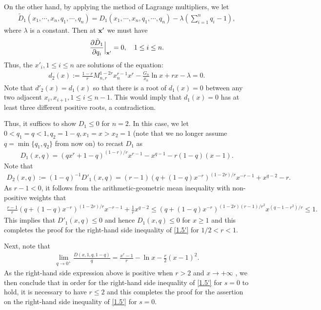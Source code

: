 \documentclass[11pt]{amsart}
\numberwithin{equation}{section}
\theoremstyle{definition}
\theoremstyle{remark}
\begin{document}
   On the other hand, by applying the method of Lagrange multipliers, we let
\begin{align*}
   \tilde{D}_1(x_1, \cdots, x_n, q_1, \cdots, q_n)=D_1(x_1, \cdots, x_n, q_1, \cdots, q_n)-\lambda(\sum^n_{i=1}q_i-1),
\end{align*}
   where $\lambda$ is a constant. Then at ${\bf x}'$ we must have
\begin{align*}
   \frac {\partial \tilde{D}_1}{\partial q_i}\Big |_{{\bf x}'}=0, \quad 1 \leq i \leq n.
\end{align*}
   Thus, the $x'_i, 1 \leq i \leq n$ are solutions of the equation:
\begin{align*}
   d_2(x) := \frac {1-r}{r}M^{1-2r}_{n,r}x^{r-1}_nx^{r}-\frac {G_n}{x_n}\ln x+rx-\lambda=0.
\end{align*}
   Note that $d'_2(x)=d_1(x)$ so that there is a root of $d_1(x)=0$ between any two adjacent $x_i, x_{i+1}, 1 \leq i \leq n-1$. This would imply that
   $d_1(x)=0$ has at least three different positive roots, a contradiction.

   Thus, it suffices to show $D_1 \leq 0$ for $n=2$. In this case, we let $0< q_1=q <1, q_2=1-q, x_1=x>x_2=1$ (note that we no longer assume $q=\min \{ q_1, q_2 \}$ from now on) to recast $D_1$ as
\begin{align*}
   D_1(x, q)=(qx^r+1-q)^{(1-r)/r}x^{r-1}-x^{q-1}-r(1-q)(x-1).
\end{align*}
    Note that
\begin{align*}
   D_2(x,q) :=(1-q)^{-1}D'_1(x, q)=(r-1)(q+(1-q)x^{-r})^{(1-2r)/r}x^{-r-1}+x^{q-2}-r.
\end{align*}
   As $r-1<0$, it follows from the arithmetic-geometric mean inequality with non-positive weights that
\begin{align*}
   \frac {r-1}{r}(q+(1-q)x^{-r})^{(1-2r)/r}x^{-r-1}+\frac 1rx^{q-2}\leq (q+(1-q)x^{-r})^{(1-2r)(r-1)/r^2}x^{(q-1-r^2)/r} \leq 1.
\end{align*}
   This implies that $D'_1(x, q) \leq 0$ and hence $D_1(x,q) \leq 0$ for $x \geq 1$ and this completes the proof for the right-hand side inequality of \eqref{1.5'} for $1/2<r<1$.

   Next, note that
\begin{align*}
  \lim_{q \rightarrow 0^+}\frac {D(x,1, q, 1-q)}{q}=\frac {x^r-1}{r}-\ln x-\frac {r}{2}(x-1)^2 .
\end{align*}
    As the right-hand side expression above is positive when $r>2$ and $x \rightarrow +\infty$ , we then conclude that in order for the right-hand side inequality of \eqref{1.5'} for $s=0$ to hold, it is necessary to have $r \leq 2$ and this completes the proof for the assertion on the right-hand side inequality of \eqref{1.5'} for $s=0$.
\end{document}
